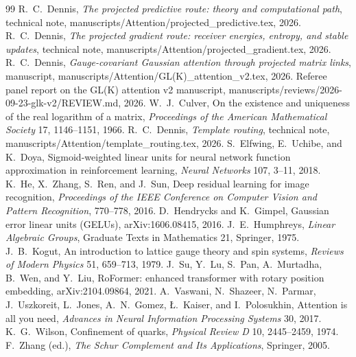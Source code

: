 \documentclass[11pt]{article}
\theoremstyle{definition}
\theoremstyle{remark}
\begin{document}
\begin{thebibliography}{99}
 R.~C.~Dennis, \emph{The projected predictive route: theory and computational path}, technical note, manuscripts/Attention/projected\_predictive.tex, 2026.
 R.~C.~Dennis, \emph{The projected gradient route: receiver energies, entropy, and stable updates}, technical note, manuscripts/Attention/projected\_gradient.tex, 2026.
 R.~C.~Dennis, \emph{Gauge-covariant Gaussian attention through projected matrix links}, manuscript, manuscripts/Attention/GL(K)\_attention\_v2.tex, 2026.
 Referee panel report on the GL(K) attention v2 manuscript, manuscripts/reviews/2026-09-23-glk-v2/REVIEW.md, 2026.
 W.~J.~Culver, On the existence and uniqueness of the real logarithm of a matrix, \emph{Proceedings of the American Mathematical Society} 17, 1146--1151, 1966.
 R.~C.~Dennis, \emph{Template routing}, technical note, manuscripts/Attention/template\_routing.tex, 2026.
 S.~Elfwing, E.~Uchibe, and K.~Doya, Sigmoid-weighted linear units for neural network function approximation in reinforcement learning, \emph{Neural Networks} 107, 3--11, 2018.
 K.~He, X.~Zhang, S.~Ren, and J.~Sun, Deep residual learning for image recognition, \emph{Proceedings of the IEEE Conference on Computer Vision and Pattern Recognition}, 770--778, 2016.
 D.~Hendrycks and K.~Gimpel, Gaussian error linear units (GELUs), arXiv:1606.08415, 2016.
 J.~E.~Humphreys, \emph{Linear Algebraic Groups}, Graduate Texts in Mathematics 21, Springer, 1975.
 J.~B.~Kogut, An introduction to lattice gauge theory and spin systems, \emph{Reviews of Modern Physics} 51, 659--713, 1979.
 J.~Su, Y.~Lu, S.~Pan, A.~Murtadha, B.~Wen, and Y.~Liu, RoFormer: enhanced transformer with rotary position embedding, arXiv:2104.09864, 2021.
 A.~Vaswani, N.~Shazeer, N.~Parmar, J.~Uszkoreit, L.~Jones, A.~N.~Gomez, {\L}.~Kaiser, and I.~Polosukhin, Attention is all you need, \emph{Advances in Neural Information Processing Systems} 30, 2017.
 K.~G.~Wilson, Confinement of quarks, \emph{Physical Review D} 10, 2445--2459, 1974.
 F.~Zhang (ed.), \emph{The Schur Complement and Its Applications}, Springer, 2005.
\end{thebibliography}
\end{document}

